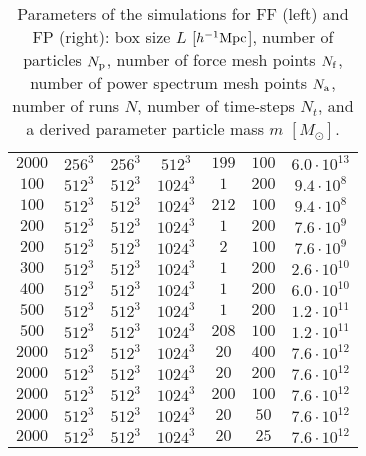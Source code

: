 \begin{table}
{\begin{tabular}{ ccccccc }
    $2000$ & $256^3$ & $256^3$ & $512^3$ & $199$ & $100$ & $6.0\cdot10^{13}$\\
    $100$ & $512^3$ & $512^3$ & $1024^3$ & $1$ & $200$ & $9.4\cdot10^{8}$\\
    $100$ & $512^3$ & $512^3$ & $1024^3$ & $212$ & $100$ & $9.4\cdot10^{8}$\\
    $200$ & $512^3$ & $512^3$ & $1024^3$ & $1$ & $200$ & $7.6\cdot10^{9}$\\
    $200$ & $512^3$ & $512^3$ & $1024^3$ & $2$ & $100$ & $7.6\cdot10^{9}$\\
    $300$ & $512^3$ & $512^3$ & $1024^3$ & $1$ & $200$ & $2.6\cdot10^{10}$\\
    $400$ & $512^3$ & $512^3$ & $1024^3$ & $1$ & $200$ & $6.0\cdot10^{10}$\\
    $500$ & $512^3$ & $512^3$ & $1024^3$ & $1$ & $200$ & $1.2\cdot10^{11}$\\
    $500$ & $512^3$ & $512^3$ & $1024^3$ & $208$ & $100$ & $1.2\cdot10^{11}$\\
    $2000$ & $512^3$ & $512^3$ & $1024^3$ & $20$ & $400$ & $7.6\cdot10^{12}$\\
    $2000$ & $512^3$ & $512^3$ & $1024^3$ & $20$ & $200$ & $7.6\cdot10^{12}$\\
    $2000$ & $512^3$ & $512^3$ & $1024^3$ & $200$ & $100$ & $7.6\cdot10^{12}$\\
    $2000$ & $512^3$ & $512^3$ & $1024^3$ & $20$ & $50$ & $7.6\cdot10^{12}$\\
    $2000$ & $512^3$ & $512^3$ & $1024^3$ & $20$ & $25$ & $7.6\cdot10^{12}$\\
    \hline
    \end{tabular}
    }
    \caption{Parameters of the simulations for FF (left) and FP (right): box size $L$ [$h^{-1}\text{Mpc}$], number of particles $N_{\rm p}$, number of force mesh points $N_{\rm f}$, number of power spectrum mesh points $N_{\rm a}$, number of runs $N$, number of time-steps $N_t$, and a derived parameter particle mass $m$ $[M_\odot]$.}
    \label{tab:sim_param_FF_FP}
    \end{table}
    
    
    